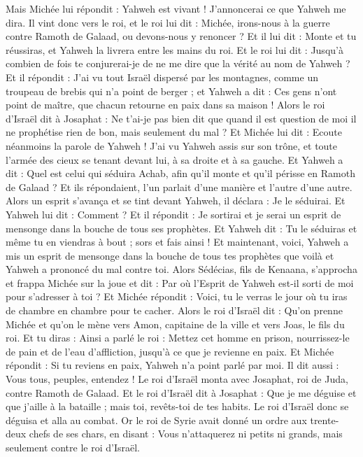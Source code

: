 \begin{multicols}{2}
Mais Michée lui répondit : Yahweh est vivant ! J'annoncerai ce que Yahweh me dira.
Il vint donc vers le roi, et le roi lui dit : Michée, irons-nous à la guerre contre Ramoth de Galaad, ou devons-nous y renoncer ? Et il lui dit : Monte et tu réussiras, et Yahweh la livrera entre les mains du roi.
Et le roi lui dit : Jusqu'à combien de fois te conjurerai-je de ne me dire que la vérité au nom de Yahweh ?
Et il répondit : J'ai vu tout Israël dispersé par les montagnes, comme un troupeau de brebis qui n'a point de berger ; et Yahweh a dit : Ces gens n'ont point de maître, que chacun retourne en paix dans sa maison !
Alors le roi d'Israël dit à Josaphat : Ne t'ai-je pas bien dit que quand il est question de moi il ne prophétise rien de bon, mais seulement du mal ?
Et Michée lui dit : Ecoute néanmoins la parole de Yahweh ! J'ai vu Yahweh assis sur son trône, et toute l'armée des cieux se tenant devant lui, à sa droite et à sa gauche.
Et Yahweh a dit : Quel est celui qui séduira Achab, afin qu'il monte et qu'il périsse en Ramoth de Galaad ? Et ils répondaient, l'un parlait d'une manière et l'autre d'une autre.
Alors un esprit s'avança et se tint devant Yahweh, il déclara : Je le séduirai. Et Yahweh lui dit : Comment ?
Et il répondit : Je sortirai et je serai un esprit de mensonge dans la bouche de tous ses prophètes. Et Yahweh dit : Tu le séduiras et même tu en viendras à bout ; sors et fais ainsi !
Et maintenant, voici, Yahweh a mis un esprit de mensonge dans la bouche de tous tes prophètes que voilà et Yahweh a prononcé du mal contre toi.
Alors Sédécias, fils de Kenaana, s'approcha et frappa Michée sur la joue et dit : Par où l'Esprit de Yahweh est-il sorti de moi pour s'adresser à toi ?
Et Michée répondit : Voici, tu le verras le jour où tu iras de chambre en chambre pour te cacher.
Alors le roi d'Israël dit : Qu'on prenne Michée et qu'on le mène vers Amon, capitaine de la ville et vers Joas, le fils du roi.
Et tu diras : Ainsi a parlé le roi : Mettez cet homme en prison, nourrissez-le de pain et de l'eau d'affliction, jusqu'à ce que je revienne en paix.
Et Michée répondit : Si tu reviens en paix, Yahweh n'a point parlé par moi. Il dit aussi : Vous tous, peuples, entendez !
Le roi d'Israël monta avec Josaphat, roi de Juda, contre Ramoth de Galaad.
Et le roi d'Israël dit à Josaphat : Que je me déguise et que j'aille à la bataille ; mais toi, revêts-toi de tes habits. Le roi d'Israël donc se déguisa et alla au combat.
Or le roi de Syrie avait donné un ordre aux trente-deux chefs de ses chars, en disant : Vous n'attaquerez ni petits ni grands, mais seulement contre le roi d'Israël.

\end{multicols}

